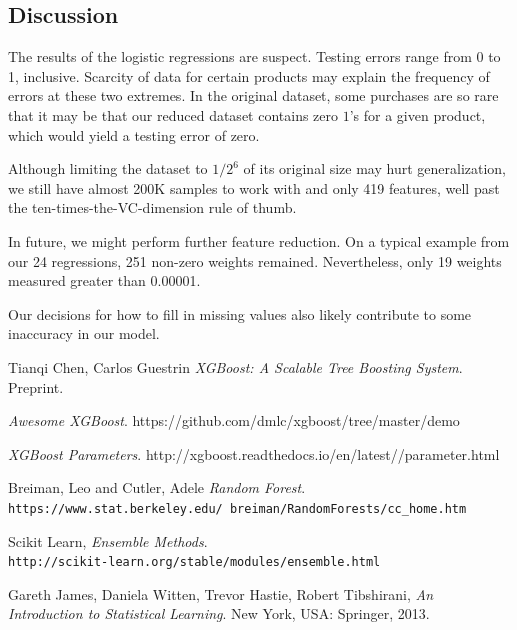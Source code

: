\documentclass{article}
\begin{document}
\begin{spacing}{1}
\begin{large}
\subsection{Discussion}

\begin{multicols}{2}


The results of the logistic regressions are suspect. Testing errors range from 0 to 1, inclusive. Scarcity of data for certain products may explain the frequency of errors at these two extremes. In the original dataset, some purchases are so rare that it may be that our reduced dataset contains zero $1$'s for a given product, which would yield a testing error of zero.

Although limiting the dataset to $1/2^6$ of its original size may hurt generalization, we still have almost 200K samples to work with and only 419 features, well past the ten-times-the-VC-dimension rule of thumb.\cite{Amlbook}

In future, we might perform further feature reduction. On a typical example from our 24 regressions, 251 non-zero weights remained. Nevertheless, only 19 weights measured greater than 0.00001.

Our decisions for how to fill in missing values also likely contribute to some inaccuracy in our model.

\end{multicols}



\begin{thebibliography}{9}

	Tianqi Chen, Carlos Guestrin
	\emph{XGBoost: A Scalable Tree Boosting System}. Preprint.

	\emph{Awesome XGBoost}.
	https://github.com/dmlc/xgboost/tree/master/demo

	\emph{XGBoost Parameters}.
	http://xgboost.readthedocs.io/en/latest//parameter.html

	Breiman, Leo and Cutler, Adele
	\textit{Random Forest}.
	\\\texttt{https://www.stat.berkeley.edu/~breiman/RandomForests/cc\_home.htm}

	Scikit Learn,
	\textit{Ensemble Methods}.
	\\\texttt{http://scikit-learn.org/stable/modules/ensemble.html}

	Gareth James, Daniela Witten, Trevor Hastie, Robert Tibshirani, \textit{An Introduction to Statistical Learning}. New York, USA: Springer, 2013.


\end{thebibliography}
\end{large}
\end{spacing}
\end{document}
